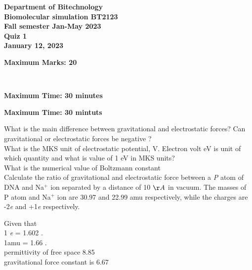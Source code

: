 \documentclass{exam}
\begin{document}
\usepackage{siunitx}
\begin{center}
  \bfseries\large
  Department of Bitechnology\\
  Biomolecular simulation   BT2123\\
  Fall semester Jan-May 2023\\
  Quiz 1\\
  January 12, 2023

\begin{flushright} \textbf{Maximum Marks: 20} \end{flushright}  \\ 

\begin{flushleft} \textbf{Maximum Time: 30 minutes} \end{flushleft}  
\vspace{5mm}
\end{center}
\begin{flushleft} \textbf{Maximum Time: 30 mintuts} \end{flushleft}

\vspace{5mm}

\begin{questions}
	\question What is the main difference between gravitational  and electrostatic forces? Can gravitational or electrostatic forces be negative ? \\  	
	\question What is the MKS unit of electrostatic potential, V. Electron volt eV is unit of which quantity and what is value of 1 eV in MKS units? 	\\
	\question What is the numerical value of Boltzmann constant \\ 
	
		\question Calculate the ratio of gravitational and electrostatic force between a \textit{P} atom of DNA and Na$^{+}$ ion separated by a distance of 10 $\AA$ in vacuum. The masses of P atom and Na$^{+}$ ion are 30.97 and 22.99 amu respectively, while the charges are -2\textit{e} and +1\textit{e} respectively.  
		
		Given that \\ 
		
	1 \textit{e}  = 1.602 . \\
	
	1amu = 1.66 . \\
	
	permittivity of free space 8.85  \\ 
	
	gravitational force constant is 6.67 \\

\end{questions}
\end{document}
